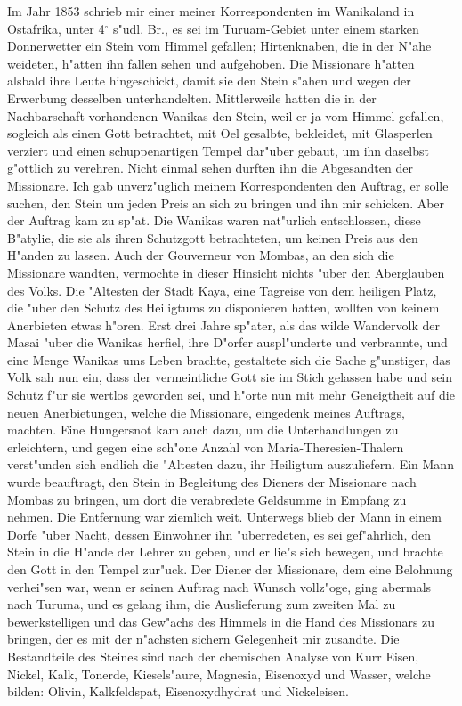 \documentclass[a4paper, 11pt, oneside]{article}
\begin{document}
Im Jahr 1853 schrieb mir einer meiner Korrespondenten im Wanikaland in Ostafrika, unter 4$^\circ$ s"udl. Br., es sei im Turuam-Gebiet unter einem starken Donnerwetter ein Stein vom Himmel gefallen; Hirtenknaben, die in der N"ahe weideten, h"atten ihn fallen sehen und aufgehoben. Die Missionare h"atten alsbald ihre Leute hingeschickt, damit sie den Stein s"ahen und wegen der Erwerbung desselben unterhandelten. Mittlerweile hatten die in der Nachbarschaft vorhandenen Wanikas den Stein, weil er ja vom Himmel gefallen, sogleich als einen Gott betrachtet, mit Oel gesalbte, bekleidet, mit Glasperlen verziert und einen schuppenartigen Tempel dar"uber gebaut, um ihn daselbst g"ottlich zu verehren. Nicht einmal sehen durften ihn die Abgesandten der Missionare. Ich gab unverz"uglich meinem Korrespondenten den Auftrag, er solle suchen, den Stein um jeden Preis an sich zu bringen und ihn mir schicken. Aber der Auftrag kam zu sp"at. Die Wanikas waren nat"urlich entschlossen, diese B"atylie, die sie als ihren Schutzgott betrachteten, um keinen Preis aus den H"anden zu lassen. Auch der Gouverneur von Mombas, an den sich die Missionare wandten, vermochte in dieser Hinsicht nichts "uber den Aberglauben des Volks. Die "Altesten der Stadt Kaya, eine Tagreise von dem heiligen Platz, die "uber den Schutz des Heiligtums zu disponieren hatten, wollten von keinem Anerbieten etwas h"oren. Erst drei Jahre sp"ater, als das wilde Wandervolk der Masai "uber die Wanikas herfiel, ihre D"orfer auspl"underte und verbrannte, und eine Menge Wanikas ums Leben brachte, gestaltete sich die Sache g"unstiger, das Volk sah nun ein, dass der vermeintliche Gott sie im Stich gelassen habe und sein Schutz f"ur sie wertlos geworden sei, und h"orte nun mit mehr Geneigtheit auf die neuen Anerbietungen, welche die Missionare, eingedenk meines Auftrags, machten. Eine Hungersnot kam auch dazu, um die Unterhandlungen zu erleichtern, und gegen eine sch"one Anzahl von Maria-Theresien-Thalern verst"unden sich endlich die "Altesten dazu, ihr Heiligtum auszuliefern. Ein Mann wurde beauftragt, den Stein in Begleitung des Dieners der Missionare nach Mombas zu bringen, um dort die verabredete Geldsumme in Empfang zu nehmen. Die Entfernung war ziemlich weit. Unterwegs blieb der Mann in einem Dorfe "uber Nacht, dessen Einwohner ihn "uberredeten, es sei gef"ahrlich, den Stein in die H"ande der Lehrer zu geben, und er lie"s sich bewegen, und brachte den Gott in den Tempel zur"uck. Der Diener der Missionare, dem eine Belohnung verhei"sen war, wenn er seinen Auftrag nach Wunsch vollz"oge, ging abermals nach Turuma, und es gelang ihm, die Auslieferung zum zweiten Mal zu bewerkstelligen und das Gew"achs des Himmels in die Hand des Missionars zu bringen, der es mit der n"achsten sichern Gelegenheit mir zusandte. Die Bestandteile des Steines sind nach der chemischen Analyse von Kurr Eisen, Nickel, Kalk, Tonerde, Kiesels"aure, Magnesia, Eisenoxyd und Wasser, welche bilden: Olivin, Kalkfeldspat, Eisenoxydhydrat und Nickeleisen.
\end{document}
